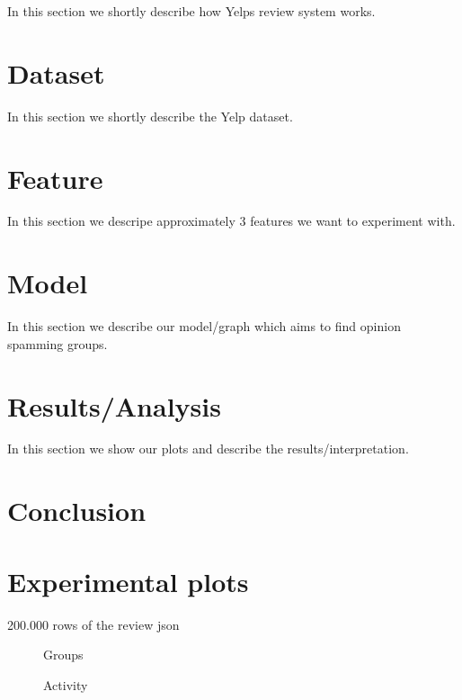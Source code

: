 \documentclass[conference]{IEEEtran}  %
\theoremstyle{plain}
\theoremstyle{definition}
\theoremstyle{remark}
\begin{document}
In this section we shortly describe how Yelps review system works. 

\section{Dataset}
\label{sec:dataset}

In this section we shortly describe the Yelp dataset.

\section{Feature}
\label{sec:feature}

In this section we descripe approximately 3 features we want to experiment with.  

\section{Model}
\label{sec:model}

In this section we describe our model/graph which aims to find opinion spamming groups.

\section{Results/Analysis}
\label{sec:analysis}

In this section we show our plots and describe the results/interpretation. 

\section{Conclusion}
\label{sec:concl}

\section{Experimental plots}
\label{sec:plots}

200.000 rows of the review json

\graphicspath{{plots/}}


\begin{figure}[H]
  \centering
  \hfill
  \caption{Groups}
\end{figure}


\begin{figure}[H]
  \centering
  \hfill
  \caption{Activity}
\end{figure}
\end{document}
